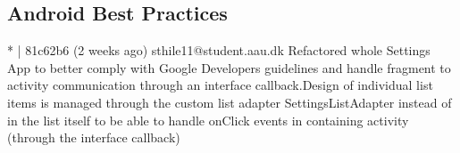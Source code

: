 \subsection{Android Best Practices}
* | 81c62b6 (2 weeks ago) sthile11@student.aau.dk Refactored whole Settings App to better comply with Google Developers guidelines and handle fragment to activity communication through an interface callback.Design of individual list items is managed through the custom list adapter SettingsListAdapter instead of in the list itself to be able to handle onClick events in containing activity (through the interface
 callback)\\